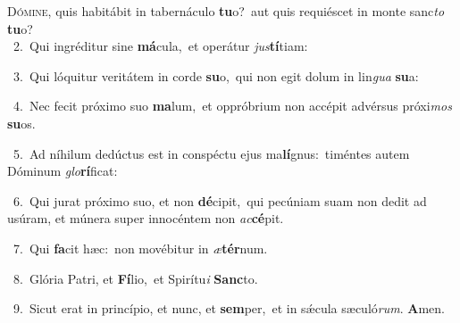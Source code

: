 \lettrine{\initial\textcolor{\initialcolor}{D}}{ómine,} quis habitábit in tabernáculo \textbf{tu}\-o?~\star aut quis requiéscet in monte sanc\textit{to} \textbf{tu}\-o?\\
{\numbfont\textcolor{\numbcolor}{~2.}}~Qui ingréditur sine \textbf{má}\-cula,~\star et operátur \textit{jus}\-\textbf{tí}tiam:\par
{\numbfont\textcolor{\numbcolor}{~3.}}~Qui lóquitur veritátem in corde \textbf{su}\-o,~\star qui non egit dolum in lin\textit{gua} \textbf{su}\-a:\par
{\numbfont\textcolor{\numbcolor}{~4.}}~Nec fecit próximo suo \textbf{ma}\-lum,~\star et oppróbrium non accépit advérsus próxi\textit{mos} \textbf{su}\-os.\par
{\numbfont\textcolor{\numbcolor}{~5.}}~Ad níhilum dedúctus est in conspéctu ejus ma\-\textbf{lí}\-gnus:~\star timéntes autem Dóminum \textit{glo}\-\textbf{rí}ficat:\par
{\numbfont\textcolor{\numbcolor}{~6.}}~Qui jurat próximo suo, et non \textbf{dé}\-cipit,~\star qui pecúniam suam non dedit ad usúram, et múnera super innocéntem non \textit{ac}\-\textbf{cé}pit.\par
{\numbfont\textcolor{\numbcolor}{~7.}}~Qui \textbf{fa}\-cit hæc:~\star non movébitur in \textit{æ}\-\textbf{tér}num.\par
{\numbfont\textcolor{\numbcolor}{~8.}}~Glória Patri, et \textbf{Fí}\-lio,~\star et Spirítu\textit{i} \textbf{Sanc}\-to.\par
{\numbfont\textcolor{\numbcolor}{~9.}}~Sicut erat in princípio, et nunc, et \textbf{sem}\-per,~\star et in sǽcula sæculó\-\textit{rum}\-. \textbf{A}\-men.\par
